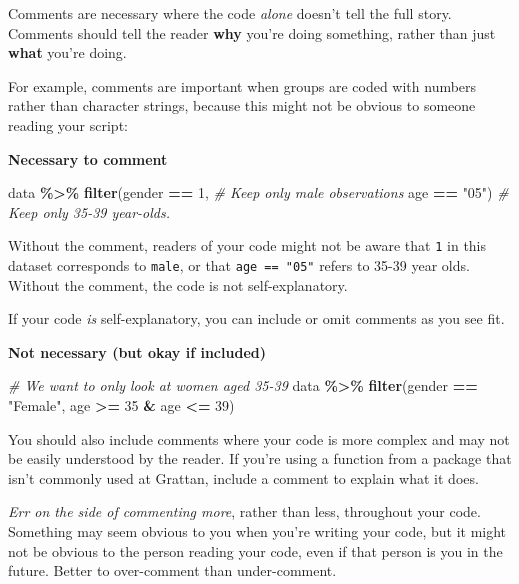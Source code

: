 \documentclass[
]{book}
\newenvironment{Shaded}{\begin{snugshade}}{\end{snugshade}}
\newcommand{\CommentTok}[1]{\textcolor[rgb]{0.56,0.35,0.01}{\textit{#1}}}
\newcommand{\DecValTok}[1]{\textcolor[rgb]{0.00,0.00,0.81}{#1}}
\newcommand{\KeywordTok}[1]{\textcolor[rgb]{0.13,0.29,0.53}{\textbf{#1}}}
\newcommand{\NormalTok}[1]{#1}
\newcommand{\OperatorTok}[1]{\textcolor[rgb]{0.81,0.36,0.00}{\textbf{#1}}}
\newcommand{\StringTok}[1]{\textcolor[rgb]{0.31,0.60,0.02}{#1}}
\begin{document}
Comments are necessary where the code \emph{alone} doesn't tell the full story. Comments should tell the reader \textbf{why} you're doing something, rather than just \textbf{what} you're doing.

For example, comments are important when groups are coded with numbers rather than character strings, because this might not be obvious to someone reading your script:

\textbf{Necessary to comment}

\begin{Shaded}
\begin{Highlighting}[]
\NormalTok{data }\OperatorTok{\%\textgreater{}\%}\StringTok{ }
\StringTok{  }\KeywordTok{filter}\NormalTok{(gender }\OperatorTok{==}\StringTok{ }\DecValTok{1}\NormalTok{,   }\CommentTok{\# Keep only male observations}
\NormalTok{         age }\OperatorTok{==}\StringTok{ "05"}\NormalTok{)   }\CommentTok{\# Keep only 35{-}39 year{-}olds. }
\end{Highlighting}
\end{Shaded}

Without the comment, readers of your code might not be aware that \texttt{1} in this dataset corresponds to \texttt{male}, or that \texttt{age\ ==\ "05"} refers to 35-39 year olds. Without the comment, the code is not self-explanatory.

If your code \emph{is} self-explanatory, you can include or omit comments as you see fit.

\textbf{Not necessary (but okay if included)}

\begin{Shaded}
\begin{Highlighting}[]
\CommentTok{\# We want to only look at women aged 35{-}39}
\NormalTok{data }\OperatorTok{\%\textgreater{}\%}\StringTok{ }
\StringTok{  }\KeywordTok{filter}\NormalTok{(gender }\OperatorTok{==}\StringTok{ "Female"}\NormalTok{,}
\NormalTok{         age }\OperatorTok{\textgreater{}=}\StringTok{ }\DecValTok{35} \OperatorTok{\&}\StringTok{ }\NormalTok{age }\OperatorTok{\textless{}=}\StringTok{ }\DecValTok{39}\NormalTok{)}
\end{Highlighting}
\end{Shaded}

You should also include comments where your code is more complex and may not be easily understood by the reader. If you're using a function from a package that isn't commonly used at Grattan, include a comment to explain what it does.

\emph{Err on the side of commenting more}, rather than less, throughout your code. Something may seem obvious to you when you're writing your code, but it might not be obvious to the person reading your code, even if that person is you in the future. Better to over-comment than under-comment.
\end{document}
